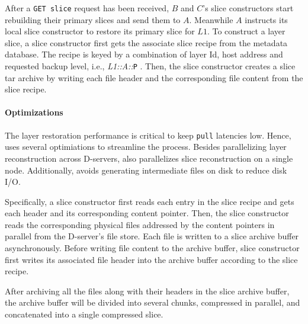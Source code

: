 After a \texttt{GET slice} request has been received, 
$B$ and $C$'s slice constructors start rebuilding their primary slices and send them to $A$.
Meanwhile $A$ instructs its local slice constructor to restore its primary slice for $L1$.
%
To construct a layer slice, a slice constructor first gets the associate slice recipe
from the metadata database. The recipe is keyed by a combination of layer Id, host address and requested
backup level, i.e., \emph{L1::A::}\texttt{P} .
Then, the slice constructor creates a slice tar archive by writing each file header and the corresponding
file content from the slice recipe.

\paragraph{Optimizations}
The layer restoration performance is critical to keep \texttt{pull} latencies low. Hence,
\sysname uses several optimiations to streamline the process.
%
Besides parallelizing layer reconstruction across D-servers, \sysname also
parallelizes slice reconstruction on a single node.
%
Additionally, \sysname avoids generating intermediate files on disk to reduce disk I/O.
%
%

Specifically, a slice constructor first reads each entry in the slice recipe
and gets each header and its corresponding content pointer.
%
Then, the slice constructor reads the corresponding physical files addressed by the content
pointers in parallel from the D-server's file store.
%
Each file is written to a slice archive buffer asynchronously.
Before writing file content to the archive buffer, slice constructor first writes its
associated file header into the archive buffer according to the slice recipe.

After archiving all the files along with their headers in the slice archive buffer,
the archive buffer will be divided into several chunks, compressed in parallel,
and concatenated into a single compressed slice.
%
%

